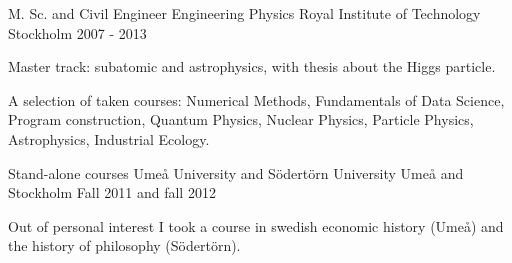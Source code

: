 


\begin{cventries}

\cventry
{M. Sc. and Civil Engineer Engineering Physics} %
{Royal Institute of Technology} %
{Stockholm} %
{2007 - 2013} %
{ %
\begin{cvitems}
\item {Master track: subatomic and astrophysics, with thesis about the Higgs particle.}
\item {A selection of taken courses: Numerical Methods, Fundamentals of Data Science, Program construction, Quantum Physics, Nuclear Physics, Particle Physics, Astrophysics, Industrial Ecology. %
}
\end{cvitems}
}

\cventry
{Stand-alone courses} %
{Ume{\aa} University and S{\"o}dert{\"o}rn University} %
{Ume{\aa} and Stockholm} %
{Fall 2011 and fall 2012} %
{ %
\begin{cvitems}
\item {Out of personal interest I took a course in swedish economic history (Ume{\aa}) and the history of philosophy (S{\"o}dert{\"o}rn).
}
\end{cvitems}
}

\end{cventries}